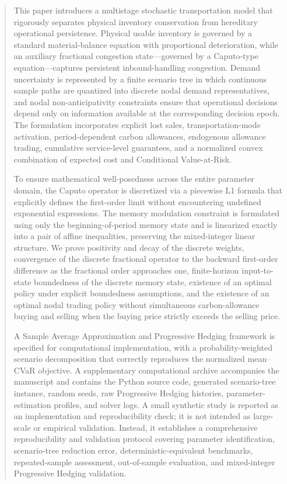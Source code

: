 \documentclass[11pt,a4paper]{article}
\begin{document}
\begin{abstract}
This paper introduces a multistage stochastic transportation model that
rigorously separates physical inventory conservation from hereditary
operational persistence. Physical usable inventory is governed by a
standard material-balance equation with proportional deterioration,
while an auxiliary fractional congestion state---governed by a Caputo-type
equation---captures persistent inbound-handling congestion. Demand
uncertainty is represented by a finite scenario tree in which continuous
sample paths are quantized into discrete nodal demand representatives,
and nodal non-anticipativity constraints ensure that operational
decisions depend only on information available at the corresponding
decision epoch. The formulation incorporates explicit lost sales,
transportation-mode activation, period-dependent carbon allowances,
endogenous allowance trading, cumulative service-level guarantees, and a
normalized convex combination of expected cost and Conditional
Value-at-Risk.

To ensure mathematical well-posedness across the entire parameter
domain, the Caputo operator is discretized via a piecewise L1 formula
that explicitly defines the first-order limit without encountering
undefined exponential expressions. The memory modulation constraint is
formulated using only the beginning-of-period memory state and is
linearized exactly into a pair of affine inequalities, preserving the
mixed-integer linear structure. We prove positivity and decay of the
discrete weights, convergence of the discrete fractional operator to the
backward first-order difference as the fractional order approaches one,
finite-horizon input-to-state boundedness of the discrete memory state,
existence of an optimal policy under explicit boundedness assumptions,
and the existence of an optimal nodal trading policy without
simultaneous carbon-allowance buying and selling when the buying price
strictly exceeds the selling price.

A Sample Average Approximation and Progressive Hedging framework is
specified for computational implementation, with a probability-weighted
scenario decomposition that correctly reproduces the normalized
mean--CVaR objective. A supplementary computational archive accompanies the manuscript and contains the Python source code, generated scenario-tree instance, random seeds, raw Progressive Hedging histories, parameter-estimation profiles, and solver logs. A small synthetic study is reported as an implementation and reproducibility check; it is not intended as large-scale or empirical validation. Instead, it establishes a comprehensive
reproducibility and validation protocol covering parameter
identification, scenario-tree reduction error, deterministic-equivalent
benchmarks, repeated-sample assessment, out-of-sample evaluation, and
mixed-integer Progressive Hedging validation.
\end{abstract}
\end{document}

